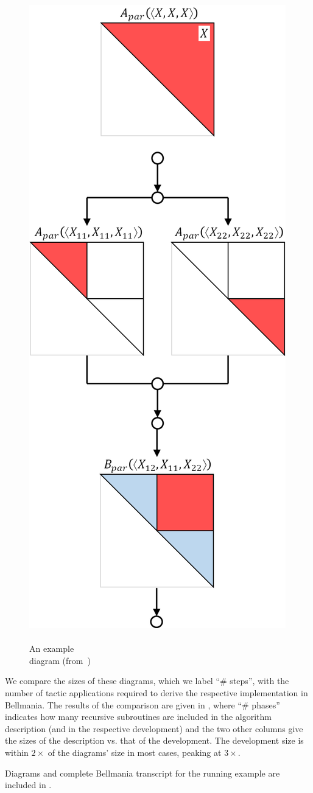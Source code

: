 \pagebreak
\setlength{\columnsep}{3mm}%
\setlength{\intextsep}{1mm}
%
\begin{figure}
\includegraphics[width=.15\textwidth,trim=0mm 0mm 2mm 15mm]{img/par-A.pdf}
\caption[An example diagram]{\label{evaluation:par-A-diag}\\
  An example \\diagram (from~\cite{PPoPP16/Chowdhury})}
\end{figure}
%

We compare the sizes of these diagrams, which we label ``\# steps'', with the number of tactic
applications required to derive the respective implementation in Bellmania.
The results of the comparison are given in , where ``\# phases''
indicates how many recursive subroutines are included in the algorithm description 
(and in the respective development) and the two other columns give the sizes of the description vs. that of the development.
The development size is within $2\times$ of the diagrams' size in most cases, peaking at $3\times$.

Diagrams and complete Bellmania transcript for the running example are included in .

